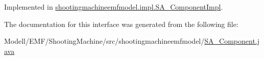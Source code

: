 Implemented in \hyperlink{classshootingmachineemfmodel_1_1impl_1_1_s_a___component_impl_a33cf8cec28514b7843445dc395c5b072}{shootingmachineemfmodel.\-impl.\-S\-A\-\_\-\-Component\-Impl}.



The documentation for this interface was generated from the following file\-:\begin{DoxyCompactItemize}
\item 
Modell/\-E\-M\-F/\-Shooting\-Machine/src/shootingmachineemfmodel/\hyperlink{_s_a___component_8java}{S\-A\-\_\-\-Component.\-java}\end{DoxyCompactItemize}
